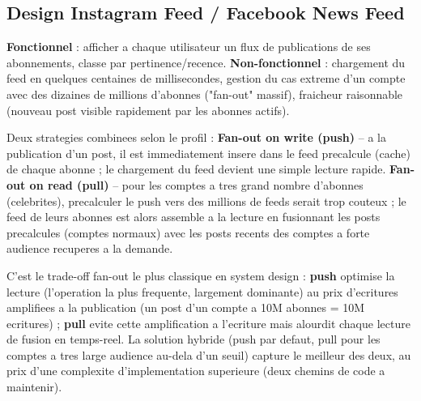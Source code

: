 \documentclass[11pt,a4paper]{article}
\newenvironment{sujet}[1]{%
  \subsection{#1}
}{%
  \bigskip
}
\begin{document}
\begin{sujet}{Design Instagram Feed / Facebook News Feed}

\begin{req}
\textbf{Fonctionnel} : afficher a chaque utilisateur un flux de publications de ses abonnements, classe par pertinence/recence. \textbf{Non-fonctionnel} : chargement du feed en quelques centaines de millisecondes, gestion du cas extreme d'un compte avec des dizaines de millions d'abonnes ("fan-out" massif), fraicheur raisonnable (nouveau post visible rapidement par les abonnes actifs).
\end{req}

\begin{archbox}
Deux strategies combinees selon le profil : \textbf{Fan-out on write (push)} -- a la publication d'un post, il est immediatement insere dans le feed precalcule (cache) de chaque abonne ; le chargement du feed devient une simple lecture rapide. \textbf{Fan-out on read (pull)} -- pour les comptes a tres grand nombre d'abonnes (celebrites), precalculer le push vers des millions de feeds serait trop couteux ; le feed de leurs abonnes est alors assemble a la lecture en fusionnant les posts precalcules (comptes normaux) avec les posts recents des comptes a forte audience recuperes a la demande.
\end{archbox}

\begin{tradeoff}
C'est le trade-off fan-out le plus classique en system design : \textbf{push} optimise la lecture (l'operation la plus frequente, largement dominante) au prix d'ecritures amplifiees a la publication (un post d'un compte a 10M abonnes = 10M ecritures) ; \textbf{pull} evite cette amplification a l'ecriture mais alourdit chaque lecture de fusion en temps-reel. La solution hybride (push par defaut, pull pour les comptes a tres large audience au-dela d'un seuil) capture le meilleur des deux, au prix d'une complexite d'implementation superieure (deux chemins de code a maintenir).
\end{tradeoff}

\end{sujet}
\end{document}

